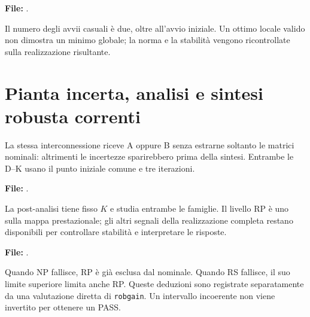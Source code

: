 \par\medskip\noindent\begin{minipage}{\linewidth}
\noindent\textbf{File:} .

\end{minipage}\par\medskip

Il numero degli avvii casuali è due, oltre all'avvio iniziale.
Un ottimo locale valido non dimostra un minimo globale; la norma e
la stabilità vengono ricontrollate sulla realizzazione risultante.

\section{Pianta incerta, analisi e sintesi robusta correnti}
La stessa interconnessione riceve A oppure B senza estrarne soltanto
le matrici nominali: altrimenti le incertezze sparirebbero prima della
sintesi. Entrambe le D--K usano il punto iniziale comune e tre iterazioni.

\par\medskip\noindent\begin{minipage}{\linewidth}
\noindent\textbf{File:} .

\end{minipage}\par\medskip

La post-analisi tiene fisso $K$ e studia entrambe le famiglie. Il
livello RP è uno sulla mappa prestazionale; gli altri segnali della
realizzazione completa restano disponibili per controllare stabilità
e interpretare le risposte.

\par\medskip\noindent\begin{minipage}{\linewidth}
\noindent\textbf{File:} .

\end{minipage}\par\medskip

Quando NP fallisce, RP è già esclusa dal nominale. Quando RS fallisce,
il suo limite superiore limita anche RP. Queste deduzioni sono
registrate separatamente da una valutazione diretta di \texttt{robgain}.
Un intervallo incoerente non viene invertito per ottenere un PASS.

